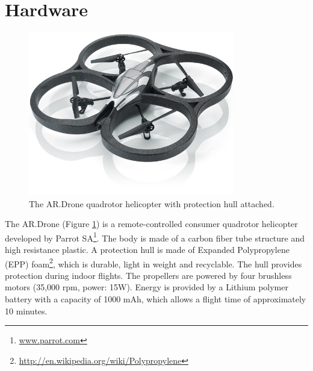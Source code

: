 \section{Hardware}
\begin{figure}[htb]
\centering
\includegraphics[width=9cm]{images/ardrone.jpg}
\caption{The AR.Drone quadrotor helicopter with protection hull attached.}
\label{fig:ardrone_hull}
\end{figure}
The AR.Drone (Figure \ref{fig:ardrone_hull}) is a remote-controlled consumer quadrotor helicopter developed by Parrot SA\footnote{\url{www.parrot.com}}.
The body is made of a carbon fiber tube structure and high resistance 
plastic.
A protection hull is made of Expanded Polypropylene (EPP) foam\footnote{\url{http://en.wikipedia.org/wiki/Polypropylene}}, which is durable, light in weight and recyclable.
The hull provides protection during indoor flights.
The propellers are powered by four brushless motors (35,000 rpm, power: 15W).
Energy is provided by a Lithium polymer battery with a capacity of 1000 mAh, which allows a flight time of approximately 10 minutes.

